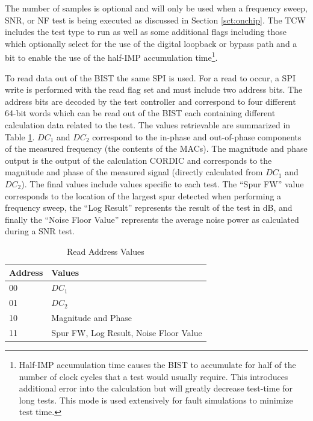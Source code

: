 \documentclass[12pt]{report}
\begin{document}
The number of samples is optional and will only be used when a frequency sweep, SNR, or NF test is being executed as discussed in Section \ref{sct:onchip}.  The TCW includes the test type to run as well as some additional flags including those which optionally select  for the use of the digital loopback or bypass path and a bit to enable the use of the half-IMP accumulation time\footnote{Half-IMP accumulation time causes the BIST to accumulate for half of the number of clock cycles that a test would usually require.  This introduces additional error into the calculation but will greatly decrease test-time for long tests\cite{jie-journal}.  This mode is used extensively for fault simulations to minimize test time.}.  

To read data out of the BIST the same SPI is used.  For a read to occur, a SPI write is performed with the read flag set and must include two address bits.  The address bits are decoded by the test controller and correspond to four different 64-bit words which can be read out of the BIST each containing different calculation data related to the test.  The values retrievable are summarized in Table \ref{tbl:readvals}.  $DC_1$ and $DC_2$ correspond to the in-phase and out-of-phase components of the measured frequency (the contents of the MACs).  The magnitude and phase output is the output of the calculation CORDIC and corresponds to the magnitude and phase of the measured signal (directly calculated from $DC_1$ and $DC_2$).  The final values include values specific to each test.  The ``Spur FW'' value corresponds to the location of the largest spur detected when performing a frequency sweep, the ``Log Result'' represents the result of the test in dB, and finally the ``Noise Floor Value'' represents the average noise power as calculated during a SNR test.
\begin{table}
	\caption{Read Address Values}
	\begin{center}
		\begin{tabular}{|l|l|}
			\hline
			Address & Values \\ \hline
			00 & $DC_1$ \\ \hline
			01 & $DC_2$ \\ \hline
			10 & Magnitude and Phase \\ \hline
			11 & Spur FW, Log Result, Noise Floor Value \\ \hline			
		\end{tabular}
	\end{center}
	\label{tbl:readvals}
\end{table}
\end{document}
